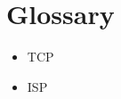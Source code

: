 \documentclass[mscthesis]{usiinfthesis}
\begin{document}
\backmatter

\chapter{Glossary}
\begin{itemize}
	\item TCP
	\item ISP
	
\end{itemize}

%
%


\end{document}
